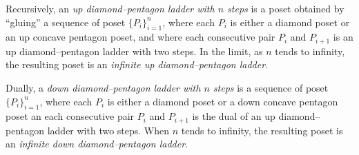 \documentclass{article}[12pt]
\theoremstyle{exampstyle}
\theoremstyle{remark}
\begin{document}
Recursively, an \textit{up diamond–pentagon ladder with $n$ steps} is a poset obtained by “gluing” a sequence of poset $\{P_i\}_{i=1}^n$, where each $P_i$  is either a diamond poset or an up concave pentagon poset, and where each consecutive pair $P_i$ and $P_{i+1}$ is an up diamond–pentagon ladder with two steps. In the limit, as $n$ tends to infinity, the resulting poset is an \textit{infinite up diamond–pentagon ladder}.

Dually, a \textit{down diamond–pentagon ladder with $n$ steps} is a sequence of poset $\{P_i\}_{i=1}^n$, where each $P_i$ is either a diamond poset or a down concave pentagon poset an each consecutive pair $P_i$ and $P_{i+1}$ is the dual of an up diamond–pentagon ladder with two steps. When $n$ tends to infinity, the resulting poset is an \textit{infinite down diamond–pentagon ladder}.
\end{document}
